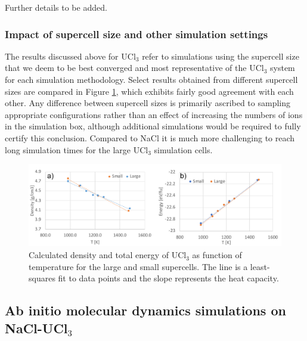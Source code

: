 \documentclass[preprint,3p,10pt,onecolumn,number,sort&compress]{elsarticle}
\begin{document}

{\color{red} Further details to be added.}

\subsubsection{Impact of supercell size and other simulation settings}
The results discussed above for UCl$_3$ refer to simulations using the supercell size that we deem to be best converged and most representative of the UCl$_3$ system for each simulation methodology. Select results obtained from different supercell sizes are compared in Figure \ref{fig:UCl3size}, which exhibits fairly good agreement with each other. Any difference between supercell sizes is primarily ascribed to sampling appropriate configurations rather than an effect of increasing the numbers of ions in the simulation box, although additional simulations would be required to fully certify this conclusion. Compared to NaCl it is much more challenging to reach long simulation times for the large UCl$_3$ simulation cells. 

\begin{figure}[htb]
\centering
\includegraphics[width=1.00\textwidth]{FIG4b.pdf}
\caption{Calculated density and total energy of UCl$_3$ as function of temperature for the large and small supercells. The line is a least-squares fit to data points and the slope represents the heat capacity.} 
\label{fig:UCl3size}
\end{figure}

\subsection{Ab initio molecular dynamics simulations on NaCl-UCl$_3$}
\end{document}
